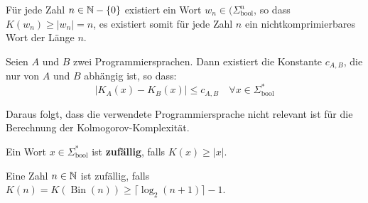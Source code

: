 \begin{lemma}
Für jede Zahl $n \in \mathbb{N} - \{0\}$ existiert ein Wort $w_n \in (\Sigma_\text{bool}^n$, so dass $K(w_n) \geq |w_n| = n$, es existiert somit für jede Zahl $n$ ein nichtkomprimierbares Wort der Länge $n$.\\
\end{lemma}

\begin{satz}
Seien $A$ und $B$ zwei Programmiersprachen. Dann existiert die Konstante $c_{A, B}$, die nur von $A$ und $B$ abhängig ist, so dass:
\[
|K_A(x) - K_B(x)| \leq c_{A, B} \quad \forall x \in \Sigma_\text{bool}^*
\]

Daraus folgt, dass die verwendete Programmiersprache nicht relevant ist für die Berechnung der Kolmogorov-Komplexität.\\
\end{satz}

\begin{definition}
Ein Wort $x \in \Sigma_\text{bool}^*$ ist \textbf{zufällig}, falls $K(x) \geq |x|$.

Eine Zahl $n \in \mathbb{N}$ ist zufällig, falls $K(n) = K(\operatorname{Bin}(n)) \geq \lceil \log_2(n+1) \rceil -1$.
\end{definition}

